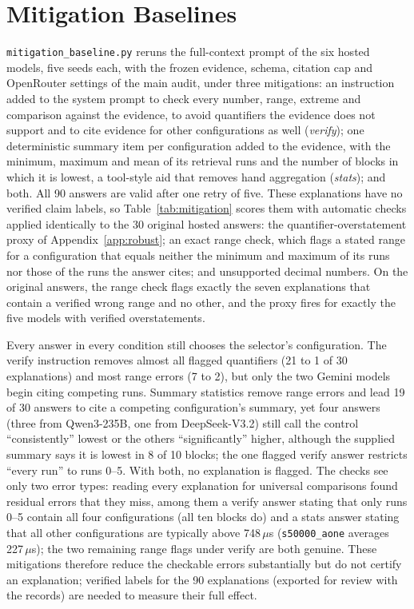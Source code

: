\section{Mitigation Baselines}
\label{app:mitigation}
\texttt{mitigation\_baseline.py} reruns the full-context prompt of the six hosted models, five seeds each, with the frozen evidence, schema, citation cap and OpenRouter settings of the main audit, under three mitigations: an instruction added to the system prompt to check every number, range, extreme and comparison against the evidence, to avoid quantifiers the evidence does not support and to cite evidence for other configurations as well (\emph{verify}); one deterministic summary item per configuration added to the evidence, with the minimum, maximum and mean of its retrieval runs and the number of blocks in which it is lowest, a tool-style aid that removes hand aggregation (\emph{stats}); and both. All 90 answers are valid after one retry of five. These explanations have no verified claim labels, so Table~\ref{tab:mitigation} scores them with automatic checks applied identically to the 30 original hosted answers: the quantifier-overstatement proxy of Appendix~\ref{app:robust}; an exact range check, which flags a stated range for a configuration that equals neither the minimum and maximum of its runs nor those of the runs the answer cites; and unsupported decimal numbers. On the original answers, the range check flags exactly the seven explanations that contain a verified wrong range and no other, and the proxy fires for exactly the five models with verified overstatements.

Every answer in every condition still chooses the selector's configuration. The verify instruction removes almost all flagged quantifiers (21 to 1 of 30 explanations) and most range errors (7 to 2), but only the two Gemini models begin citing competing runs. Summary statistics remove range errors and lead 19 of 30 answers to cite a competing configuration's summary, yet four answers (three from Qwen3-235B, one from DeepSeek-V3.2) still call the control ``consistently'' lowest or the others ``significantly'' higher, although the supplied summary says it is lowest in 8 of 10 blocks; the one flagged verify answer restricts ``every run'' to runs 0--5. With both, no explanation is flagged. The checks see only two error types: reading every explanation for universal comparisons found residual errors that they miss, among them a verify answer stating that only runs 0--5 contain all four configurations (all ten blocks do) and a stats answer stating that all other configurations are typically above 748\,$\mu$s (\texttt{s50000\_aone} averages 227\,$\mu$s); the two remaining range flags under verify are both genuine. These mitigations therefore reduce the checkable errors substantially but do not certify an explanation; verified labels for the 90 explanations (exported for review with the records) are needed to measure their full effect.

